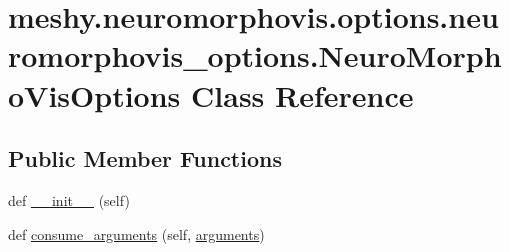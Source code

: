 \hypertarget{classmeshy_1_1neuromorphovis_1_1options_1_1neuromorphovis__options_1_1NeuroMorphoVisOptions}{}\section{meshy.\+neuromorphovis.\+options.\+neuromorphovis\+\_\+options.\+Neuro\+Morpho\+Vis\+Options Class Reference}
\label{classmeshy_1_1neuromorphovis_1_1options_1_1neuromorphovis__options_1_1NeuroMorphoVisOptions}


 


\subsection*{Public Member Functions}
\begin{DoxyCompactItemize}
\item 
def \hyperlink{classmeshy_1_1neuromorphovis_1_1options_1_1neuromorphovis__options_1_1NeuroMorphoVisOptions_a3c1b513de4334fd78201b8f414e19b63}{\+\_\+\+\_\+init\+\_\+\+\_\+} (self)
\item 
def \hyperlink{classmeshy_1_1neuromorphovis_1_1options_1_1neuromorphovis__options_1_1NeuroMorphoVisOptions_aa65d01543760098a699b9175490b946c}{consume\+\_\+arguments} (self, \hyperlink{namespacemeshy_a307b1e345e459700c6baa2aaa382d411}{arguments})
\end{DoxyCompactItemize}
